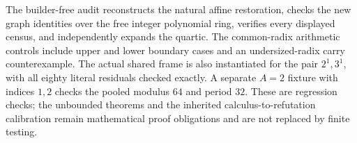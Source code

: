 The builder-free audit reconstructs the natural affine restoration,
checks the new graph identities over the free integer polynomial ring,
verifies every displayed census, and independently expands the quartic.
The common-radix arithmetic controls include upper and lower boundary
cases and an undersized-radix carry counterexample. The actual shared
frame is also instantiated for the pair $2^1,3^1$, with all eighty
literal residuals checked exactly. A separate $A=2$ fixture with
indices $1,2$ checks the pooled modulus $64$ and period $32$.
These are regression checks; the unbounded theorems and the inherited
calculus-to-refutation calibration remain mathematical proof obligations
and are not replaced by finite testing.
